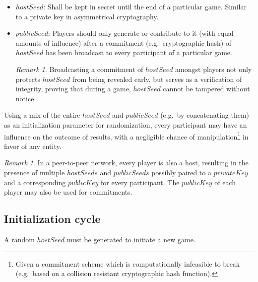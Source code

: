 \documentclass[a4paper]{article}
\theoremstyle{definition}
\theoremstyle{remark}
\newtheorem{remark}[algorithm]{Remark}
\begin{document}
\begin{itemize}
\item \(hostSeed\): Shall be kept in secret until the end of a particular game. Similar to a private key in asymmetrical cryptography.

\item \(publicSeed\): Players should only generate or contribute to it (with equal amounts of influence) after a commitment (e.g.\ cryptographic hash) of \(hostSeed\) has been broadcast to every participant of a particular game.

\begin{remark}
Broadcasting a commitment of \(hostSeed\) amongst players not only protects \(hostSeed\) from being revealed early, but serves as a verification of integrity, proving that during a game, \(hostSeed\) cannot be tampered without notice.
\end{remark}
\end{itemize}

Using a mix of the entire \(hostSeed\) and \(publicSeed\) (e.g.\ by concatenating them) as an initialization parameter for randomization, every participant may have an influence on the outcome of results, with a negligible chance of manipulation\footnote{Given a commitment scheme which is computationally infeasible to break (e.g.\ based on a collision resistant cryptographic hash function).} in favor of any entity.

\begin{remark}
In a peer-to-peer network, every player is also a host, resulting in the presence of multiple \(hostSeeds\) and \(publicSeeds\) possibly paired to a \(privateKey\) and a corresponding \(publicKey\) for every participant. The \(publicKey\) of each player may also be used for commitments.
\end{remark}

\subsection{Initialization cycle}
A random \(hostSeed\) must be generated to initiate a new game.
\end{document}

